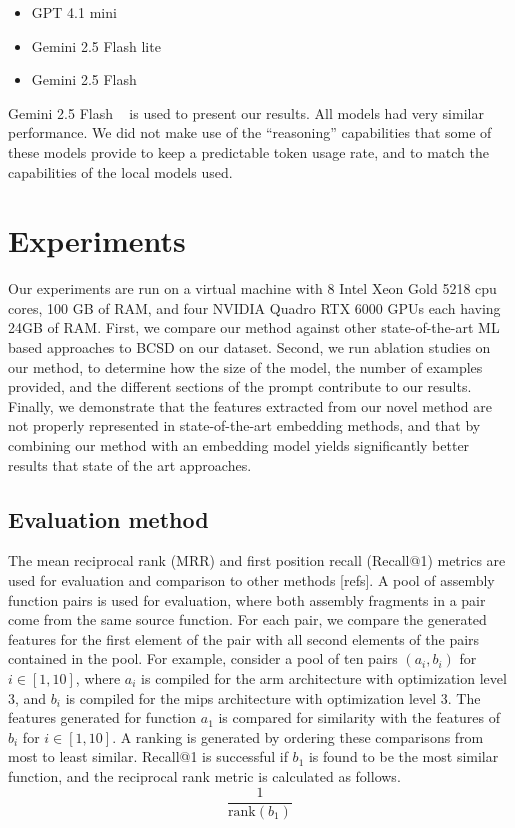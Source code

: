 \documentclass[conference,compsoc]{IEEEtran}
\begin{document}
\begin{itemize}
    \item GPT 4.1 mini ~\cite{gpt4}
    \item Gemini 2.5 Flash lite ~\cite{gemini2.5}
    \item Gemini 2.5 Flash ~\cite{gemini2.5}
\end{itemize}

Gemini 2.5 Flash ~\cite{gemini2.5} is used to present our results. All models had very similar performance. We did not make use of the ``reasoning''
capabilities that some of these models provide to keep a predictable token usage rate, and to match the capabilities of the local models used.

\section{Experiments}

Our experiments are run on a virtual machine with 8 Intel Xeon Gold 5218 cpu cores, 100 GB of RAM, and four NVIDIA Quadro RTX
6000 GPUs each having  24GB of RAM. First, we compare our method against other state-of-the-art ML based
approaches to BCSD on our dataset. Second, we run ablation studies on our method, to determine how the size
of the model, the number of examples provided, and the different sections of the prompt contribute to our results.
Finally, we demonstrate that the features extracted from our novel method are not properly represented
in state-of-the-art embedding methods, and that by combining our method with an embedding model yields significantly
better results that state of the art approaches.

\subsection{Evaluation method}

The mean reciprocal rank (MRR) and first position recall (Recall@1) metrics are used for evaluation and comparison to other methods
[refs].
A pool of assembly function pairs is used for evaluation, where both assembly fragments in a pair come from the same source function.
For each pair, we compare the generated features for the first element of the pair with all second elements of the pairs contained
in the pool.  For example, consider a pool of ten pairs \((a_i, b_i)\) for \(i \in [1, 10]\), where \(a_i\) is compiled for the arm
architecture with optimization level 3, and \(b_i\) is compiled for the mips architecture with optimization
level 3. The features generated for function \(a_1\) is compared for similarity with the features of \(b_i\) for \(i \in [1, 10]\).
A ranking is generated by ordering these comparisons from most to least similar. Recall@1 is successful
if \(b_1\) is found to be the most similar function, and the reciprocal rank metric is calculated as follows.
\[\frac{1}{\text{rank}(b_1)}\]
\end{document}

